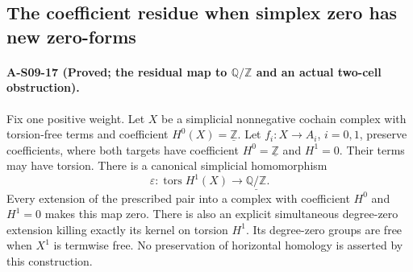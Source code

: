 \subsection{The coefficient residue when simplex zero has new zero-forms}

\paragraph{A-S09-17 (Proved; the residual map to $\mathbb Q/\mathbb Z$ and an actual two-cell obstruction).}
Fix one positive weight.  Let $X$ be a simplicial nonnegative
cochain complex with torsion-free terms and coefficient
$H^0(X)=\underline{\mathbb Z}$.  Let $f_i:X\to A_i$,
$i=0,1$, preserve coefficients, where both targets have
coefficient $H^0=\underline{\mathbb Z}$ and $H^1=0$.
Their terms may have torsion.  There is a canonical
simplicial homomorphism
\[
 \varepsilon:\operatorname{tors}H^1(X)
                         \longrightarrow\underline{\mathbb Q/\mathbb Z}.
 \tag{S09.66}
\]
Every extension of the prescribed pair into a complex
with coefficient $H^0$ and $H^1=0$ makes this map zero.
There is also an explicit simultaneous degree-zero
extension killing exactly its kernel on torsion
$H^1$.  Its degree-zero groups are free when $X^1$
is termwise free.  No preservation of horizontal
homology is asserted by this construction.

